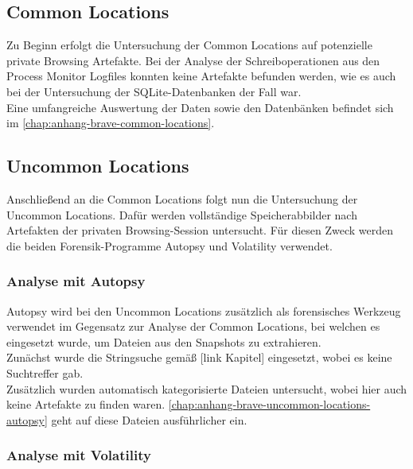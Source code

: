 \subsection*{Common Locations}\label{chap:ergebnisse-brave-common-locations}

Zu Beginn erfolgt die Untersuchung der Common Locations auf potenzielle private Browsing Artefakte. Bei der Analyse der Schreiboperationen aus den Process Monitor Logfiles konnten keine Artefakte befunden werden, wie es auch bei der Untersuchung der SQLite-Datenbanken der Fall war.\\
Eine umfangreiche Auswertung der Daten sowie den Datenbänken befindet sich im \autoref{chap:anhang-brave-common-locations}.

\subsection*{Uncommon Locations}\label{chap:ergebnisse-brave-uncommon-locations}

Anschließend an die Common Locations folgt nun die Untersuchung der Uncommon Locations. Dafür werden vollständige Speicherabbilder nach Artefakten der privaten Browsing-Session untersucht. Für diesen Zweck werden die beiden Forensik-Programme Autopsy und Volatility verwendet.

\subsubsection*{Analyse mit Autopsy}\label{chap:ergebnisse-brave-uncommon-locations-autopsy}

Autopsy wird bei den Uncommon Locations zusätzlich als forensisches Werkzeug verwendet im Gegensatz zur Analyse der Common Locations, bei welchen es eingesetzt wurde, um Dateien aus den Snapshots zu extrahieren.\\
Zunächst wurde die Stringsuche gemäß [link Kapitel] eingesetzt, wobei es keine Suchtreffer gab.\\
Zusätzlich wurden automatisch kategorisierte Dateien untersucht, wobei hier auch keine Artefakte zu finden waren. \autoref{chap:anhang-brave-uncommon-locations-autopsy} geht auf diese Dateien ausführlicher ein.

\subsubsection*{Analyse mit Volatility}\label{chap:ergebnisse-brave-uncommon-locations-volatility}

